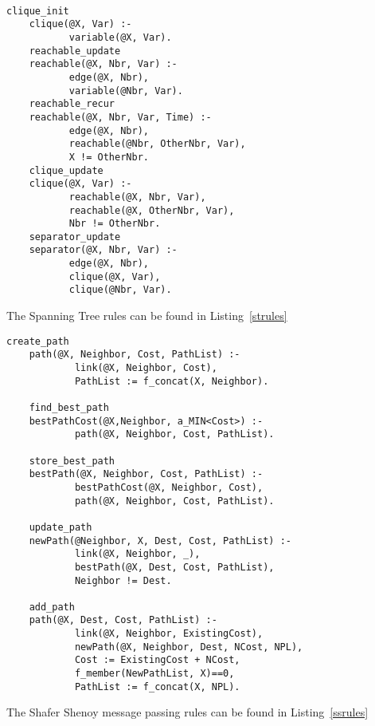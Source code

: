 \begin{figure*}[tpb]
\tt
{\begin{lstlisting}[frame=trbl, caption={Junction Tree rules},
label=jtrules, captionpos=b, basicstyle=\footnotesize, boxpos=c]
	clique_init
	clique(@X, Var) :- 
	       variable(@X, Var).      
	reachable_update
	reachable(@X, Nbr, Var) :- 
	       edge(@X, Nbr),
	       variable(@Nbr, Var).
	reachable_recur
	reachable(@X, Nbr, Var, Time) :- 
	       edge(@X, Nbr),
	       reachable(@Nbr, OtherNbr, Var),
	       X != OtherNbr.
	clique_update
	clique(@X, Var) :- 
	       reachable(@X, Nbr, Var),
	       reachable(@X, OtherNbr, Var),
	       Nbr != OtherNbr.
	separator_update
	separator(@X, Nbr, Var) :- 
	       edge(@X, Nbr),
	       clique(@X, Var),
	       clique(@Nbr, Var).
\end{lstlisting}
}

\end{figure*}

The Spanning Tree rules can be found in Listing~\ref{strules}

\begin{figure*}[tpb]
\tt

{\begin{lstlisting}[frame=trbl, caption={Spanning Tree rules},
label=strules, captionpos=b, basicstyle=\footnotesize, boxpos=c]
	create_path
	path(@X, Neighbor, Cost, PathList) :-
	        link(@X, Neighbor, Cost), 
	        PathList := f_concat(X, Neighbor).

	find_best_path
	bestPathCost(@X,Neighbor, a_MIN<Cost>) :-
	        path(@X, Neighbor, Cost, PathList).

	store_best_path
	bestPath(@X, Neighbor, Cost, PathList) :-
	        bestPathCost(@X, Neighbor, Cost), 
	        path(@X, Neighbor, Cost, PathList).

	update_path
	newPath(@Neighbor, X, Dest, Cost, PathList) :-
	        link(@X, Neighbor, _),
	        bestPath(@X, Dest, Cost, PathList),
	        Neighbor != Dest.

	add_path
	path(@X, Dest, Cost, PathList) :-
	        link(@X, Neighbor, ExistingCost), 
	        newPath(@X, Neighbor, Dest, NCost, NPL),
	        Cost := ExistingCost + NCost,
	        f_member(NewPathList, X)==0, 
	        PathList := f_concat(X, NPL).

\end{lstlisting}
}
\end{figure*}

The Shafer Shenoy message passing rules can be found in Listing~\ref{ssrules}


